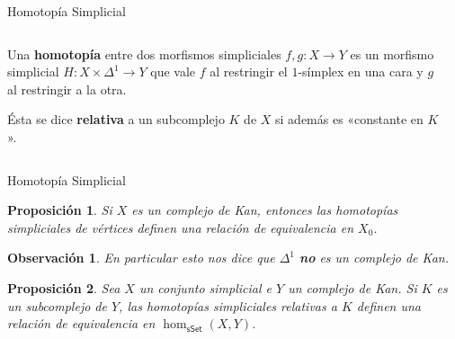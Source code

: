 \documentclass[11pt]{beamer}
\newcommand{\cat}[1]{\mathsf{#1}}
\renewcommand{\ss}[1]{\Delta^{#1}}
\newcommand{\guill}[1]{«#1»}
\newtheorem{prop}{Proposición}
\newtheorem{obs}{Observación}
\begin{document}
\begin{frame}{Homotopía Simplicial}
\begin{columns}
\begin{column}{0.5\textwidth}
\vspace{5pt}

Una \textbf{homotopía} entre dos morfismos simpliciales $f,g : X \to Y$ es un morfismo simplicial $H : X \times \ss{1} \to Y$ que vale $f$ al restringir el $1$-símplex en una cara y $g$ al restringir a la otra.
\vspace{30pt}

Ésta se dice \textbf{relativa} a un subcomplejo $K$ de $X$ si además es \guill{constante en $K$}.
\end{column} 
\begin{column}{0.5\textwidth}  \begin{center}
\end{center}
\begin{center}
\end{center}
\end{column}
\end{columns}
\end{frame}

\begin{frame}{Homotopía Simplicial}
\begin{prop} Si $X$ es un complejo de Kan, entonces las homotopías simpliciales de vértices definen una relación de equivalencia en $X_0$.
\end{prop}
\begin{obs} En particular esto nos dice que $\ss{1}$ \textbf{no} es un complejo de Kan.
\end{obs}
\begin{prop} Sea $X$ un conjunto simplicial e $Y$ un complejo de Kan. Si $K$ es un subcomplejo de $Y$, las homotopías simpliciales relativas a $K$ definen una relación de equivalencia en $\hom_{\cat{sSet}}(X,Y)$.
\end{prop}
\end{frame}
\end{document}
